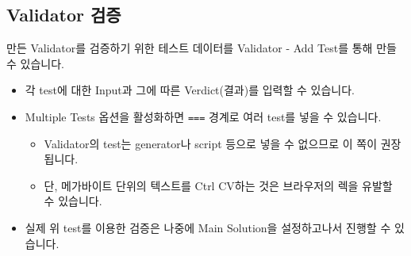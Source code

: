 \documentclass{article}
\begin{document}
    \subsection{Validator 검증}
    만든 Validator를 검증하기 위한 테스트 데이터를 Validator - Add Test를 통해 만들 수 있습니다.
    \begin{itemize}
        \item 각 test에 대한 Input과 그에 따른 Verdict(결과)를 입력할 수 있습니다.
        \item Multiple Tests 옵션을 활성화하면 \verb|===| 경계로 여러 test를 넣을 수 있습니다.
        \begin{itemize}
            \item Validator의 test는 generator나 script 등으로 넣을 수 없으므로 이 쪽이 권장됩니다.
            \item 단, 메가바이트 단위의 텍스트를 Ctrl CV하는 것은 브라우저의 렉을 유발할 수 있습니다.
        \end{itemize}
        \item 실제 위 test를 이용한 검증은 나중에 Main Solution을 설정하고나서 진행할 수 있습니다.
    \end{itemize}
\end{document}
